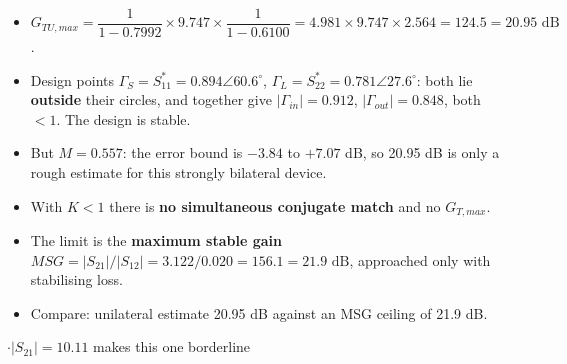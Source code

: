 \begin{itemize}
  \item $G_{TU,max} = \dfrac{1}{1 - 0.7992}\times9.747\times\dfrac{1}{1 - 0.6100}
    = 4.981\times9.747\times2.564 = \boxed{124.5 = 20.95\text{ dB}}$.
  \item Design points $\Gamma_S = S_{11}^* = 0.894\angle60.6^\circ$,
    $\Gamma_L = S_{22}^* = 0.781\angle27.6^\circ$: both lie \textbf{outside} their circles, and
    together give $|\Gamma_{in}| = 0.912$, $|\Gamma_{out}| = 0.848$, both $< 1$. The design is
    stable. \added{}
  \item But $M = 0.557$: the error bound is $-3.84$ to $+7.07$ dB, so 20.95 dB is only a rough
    estimate for this strongly bilateral device.
\end{itemize}
\begin{itemize}
  \item With $K < 1$ there is \textbf{no simultaneous conjugate match} and no $G_{T,max}$.
  \item The limit is the \textbf{maximum stable gain}
    $MSG = |S_{21}|/|S_{12}| = 3.122/0.020 = 156.1 = \boxed{21.9\text{ dB}}$, approached only
    with stabilising loss.
  \item Compare: unilateral estimate 20.95 dB against an MSG ceiling of 21.9 dB.
\end{itemize}

\vspace{2pt}

{\color{sub}\footnotesize {} \gap$\cdot$\gap $|S_{21}| = 10.11$ makes this one borderline}

